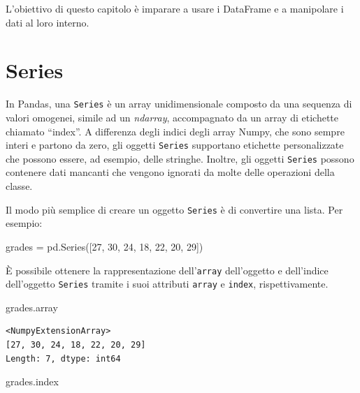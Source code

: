 \documentclass[
  letterpaper,
  krantz2]{{[}./krantz{]}}
\newenvironment{Shaded}{\begin{snugshade}}{\end{snugshade}}
\newcommand{\DecValTok}[1]{\textcolor[rgb]{0.68,0.00,0.00}{#1}}
\newcommand{\NormalTok}[1]{\textcolor[rgb]{0.00,0.23,0.31}{#1}}
\newcommand{\OperatorTok}[1]{\textcolor[rgb]{0.37,0.37,0.37}{#1}}
\begin{document}
L'obiettivo di questo capitolo è imparare a usare i DataFrame e a
manipolare i dati al loro interno.

\section{Series}\label{series}

In Pandas, una \texttt{Series} è un array unidimensionale composto da
una sequenza di valori omogenei, simile ad un \emph{ndarray},
accompagnato da un array di etichette chiamato ``index''. A differenza
degli indici degli array Numpy, che sono sempre interi e partono da
zero, gli oggetti \texttt{Series} supportano etichette personalizzate
che possono essere, ad esempio, delle stringhe. Inoltre, gli oggetti
\texttt{Series} possono contenere dati mancanti che vengono ignorati da
molte delle operazioni della classe.

Il modo più semplice di creare un oggetto \texttt{Series} è di
convertire una lista. Per esempio:

\begin{Shaded}
\begin{Highlighting}[]
\NormalTok{grades }\OperatorTok{=}\NormalTok{ pd.Series([}\DecValTok{27}\NormalTok{, }\DecValTok{30}\NormalTok{, }\DecValTok{24}\NormalTok{, }\DecValTok{18}\NormalTok{, }\DecValTok{22}\NormalTok{, }\DecValTok{20}\NormalTok{, }\DecValTok{29}\NormalTok{])}
\end{Highlighting}
\end{Shaded}

È possibile ottenere la rappresentazione dell'\texttt{array}
dell'oggetto e dell'indice dell'oggetto \texttt{Series} tramite i suoi
attributi \texttt{array} e \texttt{index}, rispettivamente.

\begin{Shaded}
\begin{Highlighting}[]
\NormalTok{grades.array}
\end{Highlighting}
\end{Shaded}

\begin{verbatim}
<NumpyExtensionArray>
[27, 30, 24, 18, 22, 20, 29]
Length: 7, dtype: int64
\end{verbatim}

\begin{Shaded}
\begin{Highlighting}[]
\NormalTok{grades.index}
\end{Highlighting}
\end{Shaded}
\end{document}
